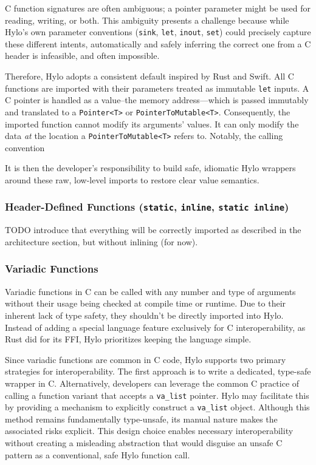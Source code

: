 C function signatures are often ambiguous; a pointer parameter might be used for reading, writing, or both. This ambiguity presents a challenge because while Hylo's own parameter conventions (\texttt{sink}, \texttt{let}, \texttt{inout}, \texttt{set}) could precisely capture these different intents, automatically and safely inferring the correct one from a C header is infeasible, and often impossible.

Therefore, Hylo adopts a consistent default inspired by Rust and Swift. All C functions are imported with their parameters treated as immutable \texttt{let} inputs. A C pointer is handled as a value--the memory address—which is passed immutably and translated to a \texttt{Pointer<T>} or \texttt{PointerToMutable<T>}. Consequently, the imported function cannot modify its arguments' values. It can only modify the data \textit{at} the location a \texttt{PointerToMutable<T>} refers to. Notably, the calling convention 

It is then the developer's responsibility to build safe, idiomatic Hylo wrappers around these raw, low-level imports to restore clear value semantics.

\subsubsection{Header-Defined Functions (\texttt{static}, \texttt{inline}, \texttt{static inline})}
\label{handling_inline_c_functions}
TODO introduce that everything will be correctly imported as described in the architecture section, but without inlining (for now).

\subsubsection{Variadic Functions}
Variadic functions in C can be called with any number and type of arguments without their usage being checked at compile time or runtime. Due to their inherent lack of type safety, they shouldn't be directly imported into Hylo. Instead of adding a special language feature exclusively for C interoperability, as Rust did for its FFI\cite{rust-variadic-ffi}, Hylo prioritizes keeping the language simple.

Since variadic functions are common in C code, Hylo supports two primary strategies for interoperability. The first approach is to write a dedicated, type-safe wrapper in C. Alternatively, developers can leverage the common C practice of calling a function variant that accepts a \texttt{va\_list} pointer\cite{wrapping-valist}. Hylo may facilitate this by providing a mechanism to explicitly construct a \texttt{va\_list} object\cite{swift-variadic-ffi}. Although this method remains fundamentally type-unsafe, its manual nature makes the associated risks explicit. This design choice enables necessary interoperability without creating a misleading abstraction that would disguise an unsafe C pattern as a conventional, safe Hylo function call.

